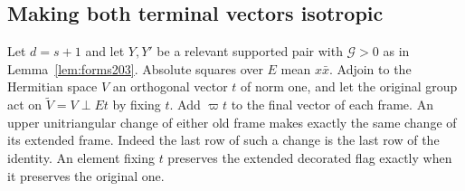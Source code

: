 \documentclass[a4paper,11pt]{article}
\theoremstyle{definition}
\theoremstyle{remark}
\numberwithin{equation}{section}
\begin{document}
\subsection{Making both terminal vectors isotropic}\label{nav:IV-55}
Let \(d=s+1\) and let \(Y,Y'\) be a relevant supported pair with
\(\mathcal G>0\) as in Lemma~\ref{lem:forms203}. Absolute squares
over \(E\) mean \(x\bar x\). Adjoin to the Hermitian space \(V\)
an orthogonal vector \(t\) of norm one, and let the original group
act on \(\widetilde V=V\perp Et\) by fixing \(t\). Add
\(\varpi t\) to the final vector of each frame. An upper
unitriangular change of either old frame makes exactly the same
change of its extended frame. Indeed the last row of such a
change is the last row of the identity. An element fixing \(t\)
preserves the extended decorated flag exactly when it preserves
the original one.
\end{document}

